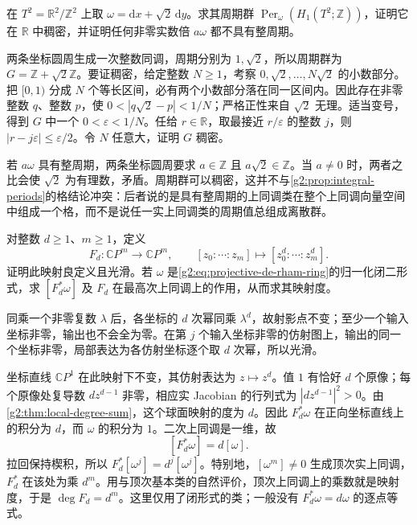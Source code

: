 \begin{exercise}\label{g2:ex:dense-period-group}
	在 \(T^2=\mathbb R^2/\mathbb Z^2\) 上取 \(\omega=\mathrm dx+\sqrt2\,\mathrm dy\)。求其周期群 \(\operatorname{Per}_{\omega}(H_1(T^2;\mathbb Z))\)，证明它在 \(\mathbb R\) 中稠密，并证明任何非零实数倍 \(a\omega\) 都不具有整周期。
\end{exercise}
\begin{solution}
	两条坐标圆周生成一次整数同调，周期分别为 \(1,\sqrt2\)，所以周期群为 \(G=\mathbb Z+\sqrt2\mathbb Z\)。要证稠密，给定整数 \(N\geq1\)，考察 \(0,\sqrt2,\ldots,N\sqrt2\) 的小数部分。把 \([0,1)\) 分成 \(N\) 个等长区间，必有两个小数部分落在同一区间内。因此存在非零整数 \(q\)、整数 \(p\)，使 \(0<|q\sqrt2-p|<1/N\)；严格正性来自 \(\sqrt2\) 无理。适当变号，得到 \(G\) 中一个 \(0<\varepsilon<1/N\)。任给 \(r\in\mathbb R\)，取最接近 \(r/\varepsilon\) 的整数 \(j\)，则 \(|r-j\varepsilon|\leq\varepsilon/2\)。令 \(N\) 任意大，证明 \(G\) 稠密。

	若 \(a\omega\) 具有整周期，两条坐标圆周要求 \(a\in\mathbb Z\) 且 \(a\sqrt2\in\mathbb Z\)。当 \(a\ne0\) 时，两者之比会使 \(\sqrt2\) 为有理数，矛盾。周期群可以稠密，这并不与\cref{g2:prop:integral-periods}的格结论冲突：后者说的是具有整周期的上同调类在整个上同调向量空间中组成一个格，而不是说任一实上同调类的周期值总组成离散群。
\end{solution}

\begin{exercise}\label{g2:ex:projective-power-map-forms}
	对整数 \(d\geq1\)、\(m\geq1\)，定义
	\[
		F_d:\mathbb CP^m\longrightarrow\mathbb CP^m,
		\qquad [z_0:\cdots:z_m]\longmapsto[z_0^d:\cdots:z_m^d].
	\]
	证明此映射良定义且光滑。若 \(\omega\) 是\eqref{g2:eq:projective-de-rham-ring}的归一化闭二形式，求 \([F_d^*\omega]\) 及 \(F_d\) 在最高次上同调上的作用，从而求其映射度。
\end{exercise}
\begin{solution}
	同乘一个非零复数 \(\lambda\) 后，各坐标的 \(d\) 次幂同乘 \(\lambda^d\)，故射影点不变；至少一个输入坐标非零，输出也不会全为零。在第 \(j\) 个输入坐标非零的仿射图上，输出的同一个坐标非零，局部表达为各仿射坐标逐个取 \(d\) 次幂，所以光滑。

	坐标直线 \(\mathbb CP^1\) 在此映射下不变，其仿射表达为 \(z\mapsto z^d\)。值 \(1\) 有恰好 \(d\) 个原像；每个原像处复导数 \(dz^{d-1}\) 非零，相应实 Jacobian 的行列式为 \(|dz^{d-1}|^2>0\)。由\cref{g2:thm:local-degree-sum}，这个球面映射的度为 \(d\)。因此 \(F_d^*\omega\) 在正向坐标直线上的积分为 \(d\)，而 \(\omega\) 的积分为 \(1\)。二次上同调是一维，故
	\[
		[F_d^*\omega]=d[\omega].
	\]
	拉回保持楔积，所以 \(F_d^*[\omega^j]=d^j[\omega^j]\)。特别地，\([\omega^m]\ne0\) 生成顶次实上同调，\(F_d^*\) 在该处为乘 \(d^m\)。用与顶次基本类的自然评价，顶次上同调上的乘数就是映射度，于是 \(\deg F_d=d^m\)。这里仅用了闭形式的类；一般没有 \(F_d^*\omega=d\omega\) 的逐点等式。
\end{solution}

